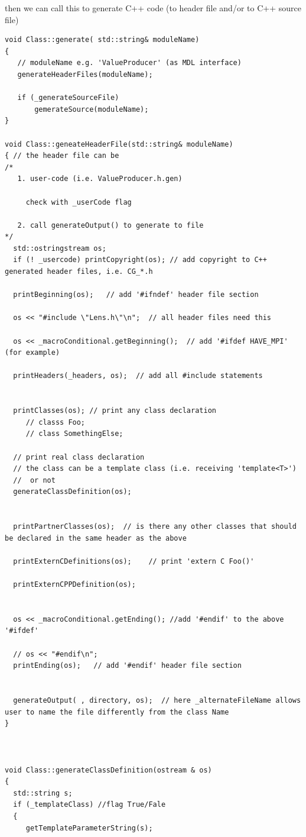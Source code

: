 then we can call this to generate C++ code (to header file and/or to C++ source file)
\begin{verbatim}
void Class::generate( std::string& moduleName)
{
   // moduleName e.g. 'ValueProducer' (as MDL interface)
   generateHeaderFiles(moduleName); 
   
   if (_generateSourceFile)
       gemerateSource(moduleName);
}

void Class::geneateHeaderFile(std::string& moduleName)
{ // the header file can be 
/*
   1. user-code (i.e. ValueProducer.h.gen)
     
     check with _userCode flag
     
   2. call generateOutput() to generate to file
*/
  std::ostringstream os;
  if (! _usercode) printCopyright(os); // add copyright to C++ generated header files, i.e. CG_*.h
  
  printBeginning(os);   // add '#ifndef' header file section

  os << "#include \"Lens.h\"\n";  // all header files need this
  
  os << _macroConditional.getBeginning();  // add '#ifdef HAVE_MPI' (for example) 
  
  printHeaders(_headers, os);  // add all #include statements
  
  
  printClasses(os); // print any class declaration 
     // classs Foo;
     // class SomethingElse; 
     
  // print real class declaration
  // the class can be a template class (i.e. receiving 'template<T>') 
  //  or not
  generateClassDefinition(os); 
  
  
  printPartnerClasses(os);  // is there any other classes that should be declared in the same header as the above
  
  printExternCDefinitions(os);    // print 'extern C Foo()'
  
  printExternCPPDefinition(os);
  
  
  os << _macroConditional.getEnding(); //add '#endif' to the above '#ifdef' 
  
  // os << "#endif\n";
  printEnding(os);   // add '#endif' header file section


  generateOutput( , directory, os);  // here _alternateFileName allows user to name the file differently from the class Name
}



void Class::generateClassDefinition(ostream & os)
{
  std::string s;
  if (_templateClass) //flag True/Fale
  {
     getTemplateParameterString(s);
     

\end{verbatim}
